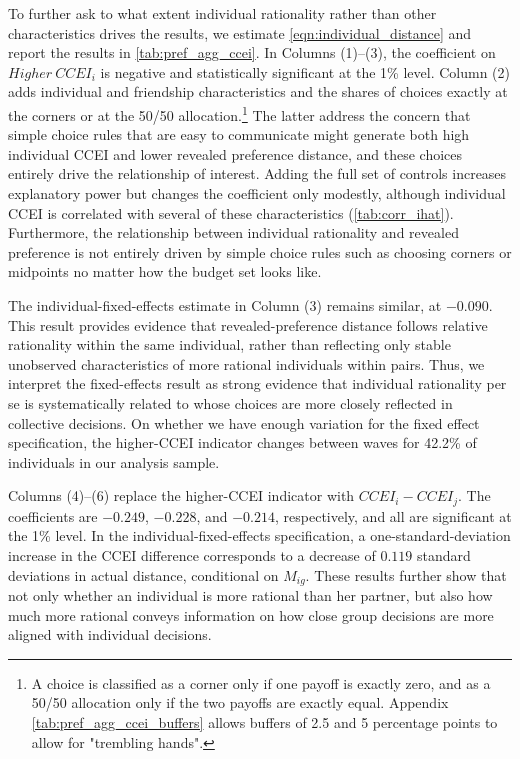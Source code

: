 \documentclass[11 pt]{article}
\begin{document}
To further ask to what extent individual rationality rather than other characteristics drives the results, we estimate \autoref{eqn:individual_distance} and report the results in \autoref{tab:pref_agg_ccei}. In Columns (1)--(3), the coefficient on $Higher\ CCEI_i$ is negative and statistically significant at the 1\% level. Column (2) adds individual and friendship characteristics and the shares of choices exactly at the corners or at the 50/50 allocation.\footnote{A choice is classified as a corner only if one payoff is exactly zero, and as a 50/50 allocation only if the two payoffs are exactly equal. Appendix \autoref{tab:pref_agg_ccei_buffers} allows buffers of 2.5 and 5 percentage points to allow for "trembling hands".} The latter address the concern that simple choice rules that are easy to communicate might generate both high individual CCEI and lower revealed preference distance, and these choices entirely drive the relationship of interest. Adding the full set of controls increases explanatory power but changes the coefficient only modestly, although individual CCEI is correlated with several of these characteristics (\autoref{tab:corr_ihat}). Furthermore, the relationship between individual rationality and revealed preference is not entirely driven by simple choice rules such as choosing corners or midpoints no matter how the budget set looks like. 

The individual-fixed-effects estimate in Column (3) remains similar, at $-0.090$. This result provides evidence that revealed-preference distance follows relative rationality within the same individual, rather than reflecting only stable unobserved characteristics of more rational individuals within pairs. Thus, we interpret the fixed-effects result as strong evidence that individual rationality per se is systematically related to whose choices are more closely reflected in collective decisions. On whether we have enough variation for the fixed effect specification, the higher-CCEI indicator changes between waves for 42.2\% of individuals in our analysis sample.

Columns (4)--(6) replace the higher-CCEI indicator with $CCEI_i-CCEI_j$. The coefficients are $-0.249$, $-0.228$, and $-0.214$, respectively, and all are significant at the 1\% level. In the individual-fixed-effects specification, a one-standard-deviation increase in the CCEI difference corresponds to a decrease of $0.119$ standard deviations in actual distance, conditional on $M_{ig}$. These results further show that not only whether an individual is more rational than her partner, but also how much more rational conveys information on how close group decisions are more aligned with individual decisions.
\end{document}
